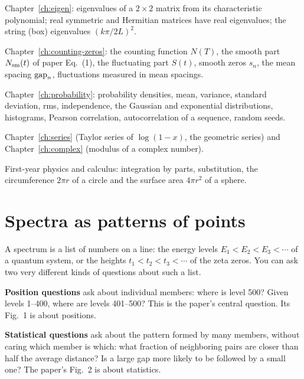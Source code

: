 \begin{prerequisites}
\item Chapter~\ref{ch:eigen}: eigenvalues of a $2\times2$ matrix from its characteristic polynomial; real symmetric and Hermitian matrices have real eigenvalues; the string (box) eigenvalues $(k\pi/2L)^2$.
\item Chapter~\ref{ch:counting-zeros}: the counting function $N(T)$, the smooth part $N_{\mathrm{sm}}(t)$ of paper Eq.~(1), the fluctuating part $S(t)$, smooth zeros $s_n$, the mean spacing $\mathrm{gap}_n$, fluctuations measured in mean spacings.
\item Chapter~\ref{ch:probability}: probability densities, mean, variance, standard deviation, rms, independence, the Gaussian and exponential distributions, histograms, Pearson correlation, autocorrelation of a sequence, random seeds.
\item Chapter~\ref{ch:series} (Taylor series of $\log(1-x)$, the geometric series) and Chapter~\ref{ch:complex} (modulus of a complex number).
\item First-year physics and calculus: integration by parts, substitution, the circumference $2\pi r$ of a circle and the surface area $4\pi r^2$ of a sphere.
\end{prerequisites}

\section{Spectra as patterns of points}\label{sec:level-statistics-patterns}

A spectrum is a list of numbers on a line: the energy levels $E_1<E_2<E_3<\cdots$ of a quantum system, or the heights $t_1<t_2<t_3<\cdots$ of the zeta zeros. You can ask two very different kinds of questions about such a list.

\textbf{Position questions} ask about individual members: where is level 500? Given levels 1--400, where are levels 401--500? This is the paper's central question. Its Fig.~1 is about positions.

\textbf{Statistical questions} ask about the pattern formed by many members, without caring which member is which: what fraction of neighboring pairs are closer than half the average distance? Is a large gap more likely to be followed by a small one? The paper's Fig.~2 is about statistics.

